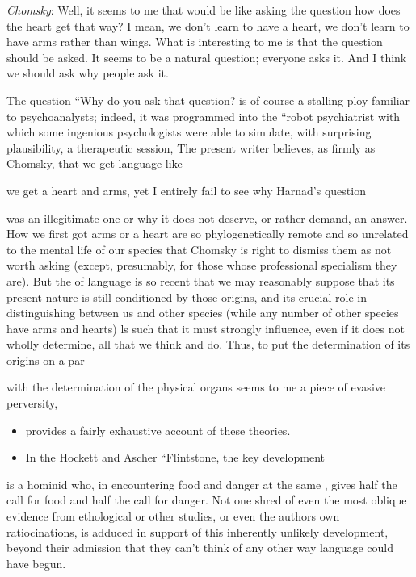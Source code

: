 \begin{itemize}
\begin{itemize}
\begin{itemize}
\begin{itemize}
\begin{itemize}
\begin{itemize}
\begin{itemize}
\begin{itemize}
\begin{itemize}
\begin{itemize}
\begin{itemize}
\begin{itemize}
\textit{Chomsky}: Well, it seems to me that would be like asking the question how does the heart get that way? I mean, we don't learn to have a heart, we don't learn to have arms rather than wings. What is interesting to me is that the question should be asked. It seems to be a natural question; everyone asks it. And I think we should ask why people ask it.

The question ``Why do you ask that question? is of course a stalling ploy familiar to psychoanalysts; indeed, it was programmed into the ``robot psychiatrist with which some ingenious psychologists were able to simulate, with surprising plausibility, a therapeutic session, The present writer believes, as firmly as Chomsky, that we get language like

we get a heart and arms, yet I entirely fail to see why Harnad's question

was an illegitimate one or why it does not deserve, or rather demand, an answer. How we first got arms or a heart are  so phylo\-genetically remote and so unrelated to the mental life of our species that Chomsky is right to dismiss them as not worth asking (except, presumably, for those whose professional specialism they are). But the  of language is so recent that we may reasonably suppose that its present nature is still conditioned by those origins, and its crucial role in distinguishing between us and other species (while any number of other species have arms and hearts) ls such that it must strongly influence, even if it does not wholly determine, all that we think and do. Thus, to put the determination of its origins on a par

with the determination of the  physical organs seems to me a piece of evasive perversity,


\begin{itemize}
\item \citet{Hewes1975} provides a fairly exhaustive account of these theories.
\item In the Hockett and Ascher ``Flintstone, the key development
\end{itemize}

is a hominid who, in encountering food and danger at the same , gives half the call for food and half the call for danger. Not one shred of even the most oblique evidence from ethological or other studies, or even the authors own ratiocinations, is adduced in support of this inherently unlikely development, beyond their admission that they can't think of any other way language could have begun.


\end{itemize}
\end{itemize}
\end{itemize}
\end{itemize}
\end{itemize}
\end{itemize}
\end{itemize}
\end{itemize}
\end{itemize}
\end{itemize}
\end{itemize}
\end{itemize}
